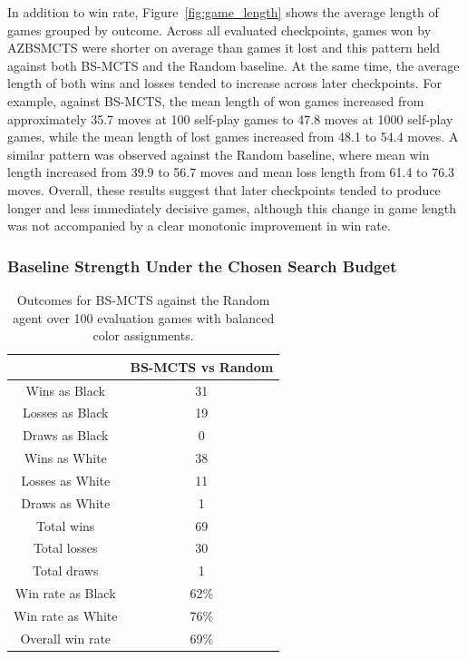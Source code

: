 \documentclass[12pt,oneside,openright]{article}
\begin{document}
In addition to win rate, Figure~\ref{fig:game_length} shows the average length of games grouped by outcome. Across all evaluated checkpoints, games won by AZBSMCTS were shorter on average than games it lost and this pattern held against both BS-MCTS and the Random baseline. At the same time, the average length of both wins and losses tended to increase across later checkpoints. For example, against BS-MCTS, the mean length of won games increased from approximately 35.7 moves at 100 self-play games to 47.8 moves at 1000 self-play games, while the mean length of lost games increased from 48.1 to 54.4 moves. A similar pattern was observed against the Random baseline, where mean win length increased from 39.9 to 56.7 moves and mean loss length from 61.4 to 76.3 moves. Overall, these results suggest that later checkpoints tended to produce longer and less immediately decisive games, although this change in game length was not accompanied by a clear monotonic improvement in win rate.

\subsubsection{Baseline Strength Under the Chosen Search Budget}

\begin{table}[H]
  \centering
  \label{tab:baseline}
  \caption{Outcomes for BS-MCTS against the Random agent over 100 evaluation games with balanced color assignments.}
  \begin{tabular}{c | c}
    \toprule
                      & \textbf{BS-MCTS vs Random} \\
    \midrule
    Wins as Black     & 31                         \\
    Losses as Black   & 19                         \\
    Draws as Black    & 0                          \\
    Wins as White     & 38                         \\
    Losses as White   & 11                         \\
    Draws as White    & 1                          \\
    Total wins        & 69                         \\
    Total losses      & 30                         \\
    Total draws       & 1                          \\
    Win rate as Black & 62\%                       \\
    Win rate as White & 76\%                       \\
    Overall win rate  & 69\%                       \\
    \bottomrule
  \end{tabular}
\end{table}
\end{document}
